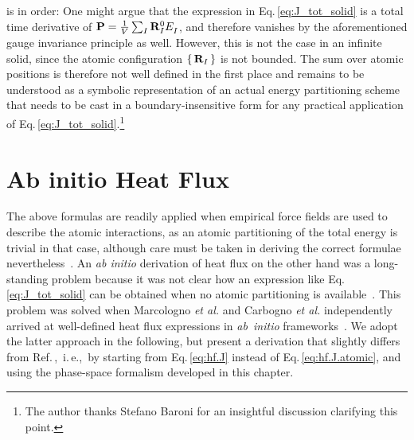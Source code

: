 is in order: One might argue that the expression in Eq.\,\eqref{eq:J_tot_solid} is a total time derivative of ${\bf P} = \frac{1}{V}  \sum_I {\bf R}_I^0 \fD E_I$, and therefore vanishes by the aforementioned gauge invariance principle as well. However, this is not the case in an infinite solid, since the atomic configuration $\set{{\bf R}_I}$ is not bounded. The sum over atomic positions is therefore not well defined in the first place and remains to be understood as a symbolic representation of an actual energy partitioning scheme that needs to be cast in a boundary-insensitive form for any practical application of Eq.\,\eqref{eq:J_tot_solid}.\footnote{The author thanks Stefano Baroni for an insightful discussion clarifying this point.}

\section{Ab initio Heat Flux}
\label{sec:ab_initio_heat_flux}
The above formulas are readily applied when empirical force fields are used to describe the atomic interactions, as an atomic partitioning of the total energy is trivial in that case, although care must be taken in deriving the correct formulae nevertheless~\cite{Fan2015,Boone2019}. An \emph{ab initio} derivation of heat flux on the other hand was a long-standing problem because it was not clear how an expression like Eq.\,\eqref{eq:J_tot_solid} can be obtained when no atomic partitioning is available~\cite{Stackhouse2010}. This problem was solved when Marcologno \emph{et al.} and Carbogno \emph{et al.} independently arrived at well-defined heat flux expressions in \mbox{\emph{ab initio}} frameworks~\cite{Marcolongo2016,Carbogno2016}. We adopt the latter approach in the following, but present a derivation that slightly differs from Ref.\,\cite{Carbogno2016},~i.\,e.,~by starting from Eq.\,\eqref{eq:hf.J} instead of Eq.\,\eqref{eq:hf.J.atomic}, and using the phase-space formalism developed in this chapter.

